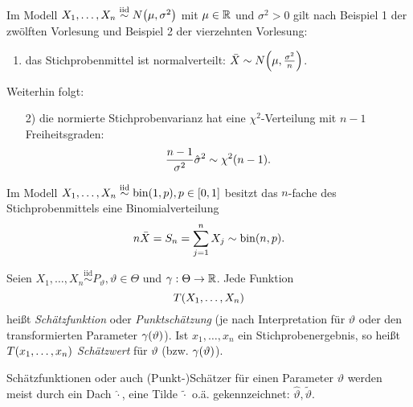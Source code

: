 \documentclass{lecture}
\begin{document}
    \begin{example}
        Im Modell \(X_1, \ldots, X_n \stackrel{\text{iid}}{\sim} N\parentheses*{\mu, \sigma^2}\) mit \(\mu \in \mathbb{R}\) und \(\sigma^2 > 0\) gilt nach Beispiel 1 der zwölften Vorlesung und Beispiel 2 der vierzehnten Vorlesung:
        \begin{enumerate}
            \item das Stichprobenmittel ist normalverteilt: \(\bar{X} \sim N\parentheses*{\mu, \frac{\sigma^2}{n}}\).
        \end{enumerate}
        Weiterhin folgt:
        \begin{enumerate}
            \item[2)] die normierte Stichprobenvarianz hat eine \(\chi^2\)-Verteilung mit \(n - 1\) Freiheitsgraden:
            \[
                \frac{n - 1}{\sigma^2}\hat{\sigma}^2 \sim \chi^2\parentheses*{n - 1}.
            \]
        \end{enumerate}
        Im Modell \(X_1, \ldots, X_n \stackrel{\text{iid}}{\sim} \bin\parentheses*{1, p}, p \in \brackets*{0, 1}\) besitzt das \(n\)-fache des Stichprobenmittels eine Binomialverteilung
        \[
            n\bar{X} = S_n = \sum_{j = 1}^n X_j \sim \bin\parentheses*{n, p}.
        \]
    \end{example}

    \begin{definition}
        Seien \(X_1, \ldots, X_n \stackrel{\text{iid}}{\sim} P_\vartheta, \vartheta \in \Theta\) und \(\gamma: \Theta \to \mathbb{R}\).
        Jede Funktion
        \[
            T\parentheses*{X_1, \ldots, X_n}
        \]
        heißt \emph{Schätzfunktion} oder \emph{Punktschätzung} (je nach Interpretation für \(\vartheta\) oder den transformierten Parameter \(\gamma\parentheses*{\vartheta}\)).
        Ist \(x_1, \ldots, x_n\) ein Stichprobenergebnis, so heißt \(T\parentheses*{x_1, \ldots, x_n}\) \emph{Schätzwert} für \(\vartheta\) (bzw. \(\gamma\parentheses*{\vartheta}\)).
    \end{definition}

    Schätzfunktionen oder auch (Punkt-)Schätzer für einen Parameter \(\vartheta\) werden meist durch ein Dach \(\hat{\cdot}\), eine Tilde \(\tilde{\cdot}\) o.ä. gekennzeichnet: \(\hat{\vartheta}, \tilde{\vartheta}\).
\end{document}
